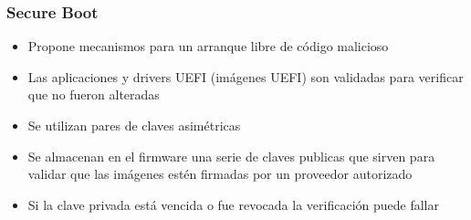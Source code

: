 \begin{frame}
	\frametitle{Secure Boot}
	\begin{itemize}
		\item Propone mecanismos para un arranque libre de código malicioso
		\item Las aplicaciones y drivers UEFI (imágenes UEFI) son validadas para verificar que no fueron alteradas
		\item Se utilizan pares de claves asimétricas
		\item Se almacenan en el firmware una serie de claves publicas que sirven para validar que las imágenes estén firmadas por un proveedor autorizado
		\item Si la clave privada está vencida o fue revocada la verificación puede fallar
	\end{itemize}
\end{frame}
